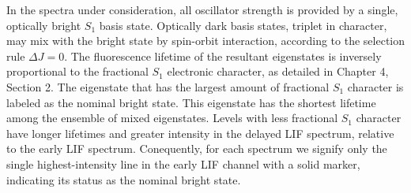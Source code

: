 \documentclass[12pt]{mitthesis}
\begin{document}
In the spectra under consideration, all oscillator strength is
provided by a single, optically bright $S_1$ basis state.  Optically
dark basis states, triplet in character, may mix with the bright state
by spin-orbit interaction, according to the selection rule $\Delta J =
0$.  The fluorescence lifetime of the resultant eigenstates is
inversely proportional to the fractional $S_1$ electronic character,
as detailed in Chapter 4, Section 2.  The eigenstate that has the
largest amount of fractional $S_1$ character is labeled as the nominal
bright state.  This eigenstate has the shortest lifetime among the
ensemble of mixed eigenstates.  Levels with less fractional $S_1$
character have longer lifetimes and greater intensity in the delayed
LIF spectrum, relative to the early LIF spectrum.  Conequently, for
each spectrum we signify only the single highest-intensity line in the
early LIF channel with a solid marker, indicating its status as the
nominal bright state.

\end{document}
